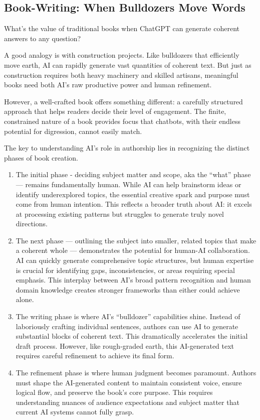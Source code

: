 \documentclass[
  Letterpaper,
]{scrbook}
\begin{document}
\subsection{Book-Writing: When Bulldozers Move
Words}\label{book-writing-when-bulldozers-move-words}

What's the value of traditional books when ChatGPT can generate coherent
answers to any question?

A good analogy is with construction projects. Like bulldozers that
efficiently move earth, AI can rapidly generate vast quantities of
coherent text. But just as construction requires both heavy machinery
and skilled artisans, meaningful books need both AI's raw productive
power and human refinement.

However, a well-crafted book offers something different: a carefully
structured approach that helps readers decide their level of engagement.
The finite, constrained nature of a book provides focus that chatbots,
with their endless potential for digression, cannot easily match.

The key to understanding AI's role in authorship lies in recognizing the
distinct phases of book creation.

\begin{enumerate}
\def\labelenumi{\arabic{enumi}.}
\item
  The initial phase - deciding subject matter and scope, aka the
  ``what'' phase --- remains fundamentally human. While AI can help
  brainstorm ideas or identify underexplored topics, the essential
  creative spark and purpose must come from human intention. This
  reflects a broader truth about AI: it excels at processing existing
  patterns but struggles to generate truly novel directions.
\item
  The next phase --- outlining the subject into smaller, related topics
  that make a coherent whole --- demonstrates the potential for human-AI
  collaboration. AI
  can quickly generate comprehensive topic structures, but human
  expertise is crucial for identifying gaps, inconsistencies, or areas
  requiring special emphasis. This interplay between AI's broad pattern
  recognition and human domain knowledge creates stronger frameworks
  than either could achieve alone.
\item
  The writing phase is where AI's ``bulldozer'' capabilities shine.
  Instead of laboriously crafting individual sentences, authors can use
  AI to generate substantial blocks of coherent text. This dramatically
  accelerates the initial draft process. However, like rough-graded
  earth, this AI-generated text requires careful refinement to achieve
  its final form.
\item
  The refinement phase is where human
  judgment becomes
  paramount. Authors must shape the AI-generated content to maintain
  consistent voice, ensure logical flow, and preserve the book's core
  purpose. This requires understanding nuances of audience expectations
  and subject matter that current AI systems cannot fully grasp.
\end{enumerate}
\end{document}
